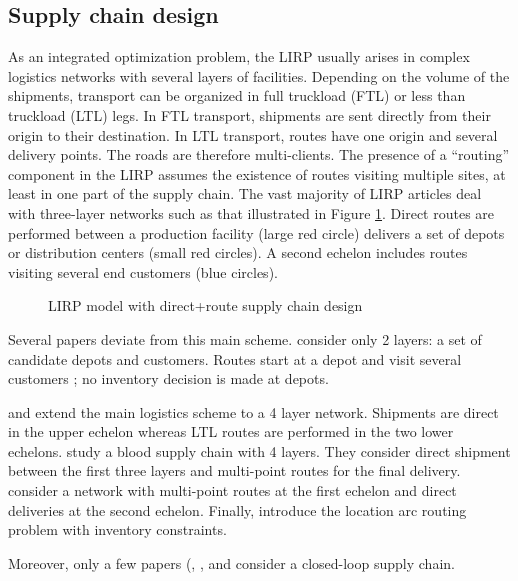 \documentclass[a4paper,10pt]{article}
\begin{document}
\begin{linenumbers}
\subsection{Supply chain design}
\label{sec:l} 

As an integrated optimization problem, the LIRP usually arises in complex logistics networks with several layers of facilities. 
Depending on the volume of the shipments, transport can be organized in full truckload (FTL) or less than truckload (LTL) legs. 
In FTL transport, shipments are sent directly from their origin to their destination. In LTL transport, routes have one origin and several delivery points. The roads are therefore multi-clients. The presence of a ``routing'' component in the LIRP assumes the existence of routes visiting multiple sites, at least in one part of the supply chain.
The vast majority of LIRP articles deal with three-layer networks such as that illustrated in Figure \ref{fig:directloop}. 
Direct routes are performed between a production facility (large red circle) delivers a set of depots or distribution centers (small red circles). A second echelon includes routes visiting several end customers (blue circles).

\begin{figure}[htbp]
	\centering
	\caption{LIRP model with direct+route supply chain design}
		\label{fig:directloop}
	\end{figure}

Several papers deviate from this main scheme.  \cite{Zhang2014} consider only 2 layers: a set of candidate depots and customers. Routes start at a depot and visit several customers ; no inventory decision is made at depots. 

\cite{AmbScu05} and \cite{Tavana2018} extend the main logistics scheme to a 4 layer network. Shipments are direct in the upper echelon whereas LTL routes are performed in the two lower echelons. 
\cite{Eskandari2018} study a blood supply chain with 4 layers. They consider direct shipment between the first three layers and multi-point routes for the final delivery. 
\cite{Bashiri2018} consider a network with multi-point routes at the first echelon and direct deliveries at the second echelon. 
Finally, \cite{Riquelme2016} introduce the location arc routing problem with inventory constraints. 

Moreover, only a few papers (\cite{LiuChenLiLiu2015}, \cite{Deng2016}, \cite{Zhalechian2016} and \cite{LiGuoWangFu2013} 
consider a closed-loop supply chain. 



\end{linenumbers}
\end{document}
